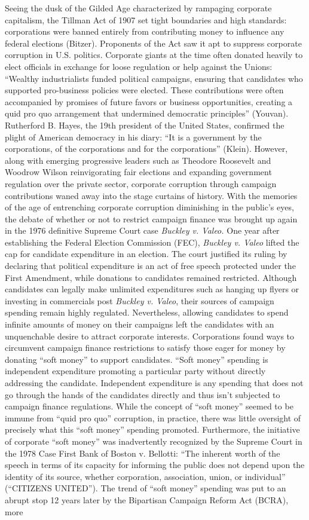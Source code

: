 Seeing the dusk of the Gilded Age characterized by rampaging corporate capitalism, the Tillman Act of 1907 set tight boundaries and high standards: corporations were banned entirely from contributing money to influence any federal elections (Bitzer). Proponents of the Act saw it apt to suppress corporate corruption in U.S. politics. Corporate giants at the time often donated heavily to elect officials in exchange for loose regulation or help against the Unions: “Wealthy industrialists funded political campaigns, ensuring that candidates who supported pro-business policies were elected. These contributions were often accompanied by promises of future favors or business opportunities, creating a quid pro quo arrangement that undermined democratic principles” (Youvan). Rutherford B. Hayes, the 19th president of the United States, confirmed the plight of American democracy in his diary: “It is a government by the corporations, of the corporations and for the corporations” (Klein). However, along with emerging progressive leaders such as Theodore Roosevelt and Woodrow Wilson reinvigorating fair elections and expanding government regulation over the private sector, corporate corruption through campaign contributions waned away into the stage curtains of history. With the memories of the age of entrenching corporate corruption diminishing in the public’s eyes, the debate of whether or not to restrict campaign finance was brought up again in the 1976 definitive Supreme Court case \emph{Buckley v. Valeo.} One year after establishing the Federal Election Commission (FEC), \emph{Buckley v. Valeo} lifted the cap for candidate expenditure in an election. The court justified its ruling by declaring that political expenditure is an act of free speech protected under the First Amendment, while donations to candidates remained restricted. Although candidates can legally make unlimited expenditures such as hanging up flyers or investing in commercials post \emph{Buckley v. Valeo}, their sources of campaign spending remain highly regulated. Nevertheless, allowing candidates to spend infinite amounts of money on their campaigns left the candidates with an unquenchable desire to attract corporate interests. Corporations found ways to circumvent campaign finance restrictions to satisfy those eager for money by donating “soft money” to support candidates. “Soft money” spending is independent expenditure promoting a particular party without directly addressing the candidate. Independent expenditure is any spending that does not go through the hands of the candidates directly and thus isn’t subjected to campaign finance regulations. While the concept of “soft money” seemed to be immune from “quid pro quo” corruption, in practice, there was little oversight of precisely what this “soft money” spending promoted. Furthermore, the initiative of corporate “soft money” was inadvertently recognized by the Supreme Court in the 1978 Case First Bank of Boston v. Bellotti: “The inherent worth of the speech in terms of its capacity for informing the public does not depend upon the identity of its source, whether corporation, association, union, or individual” (“CITIZENS UNITED”). The trend of “soft money” spending was put to an abrupt stop 12 years later by the Bipartisan Campaign Reform Act (BCRA), more 
